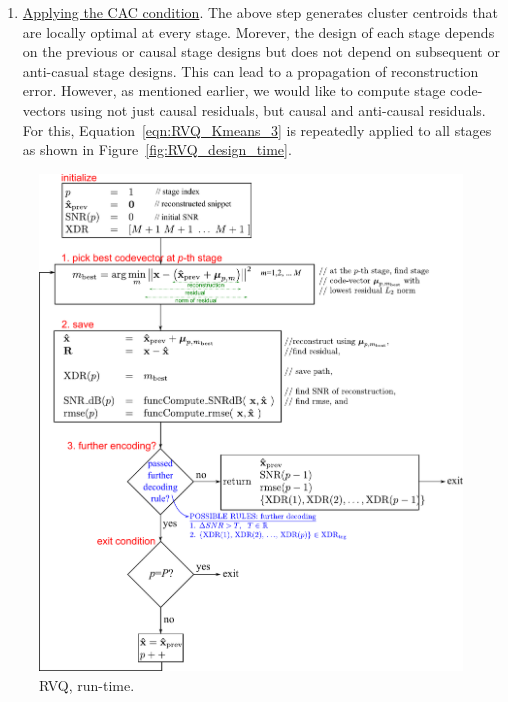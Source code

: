 \begin{enumerate}
\begin{enumerate}
\item \underline{Applying the CAC condition}.  The above step generates cluster centroids that are locally optimal at every stage.  Morever, the design of each stage depends on the previous or causal stage designs but does not depend on subsequent or anti-casual stage designs.   This can lead to a propagation of reconstruction error.  However, as mentioned earlier, we would like to compute stage code-vectors using not just causal residuals, but causal and anti-causal residuals.  For this, Equation~\ref{eqn:RVQ_Kmeans_3} is repeatedly applied to all stages as shown in Figure~\ref{fig:RVQ_design_time}.
\end{enumerate}


								\begin{figure}[h!]
								\centering
								\includegraphics[height=0.8\textheight]{thesis/RVQ_explorer_flowDiagram.pdf}
								\caption{RVQ, run-time.}
								\label{fig:RVQ_run_time}
								\end{figure}


\end{enumerate}
